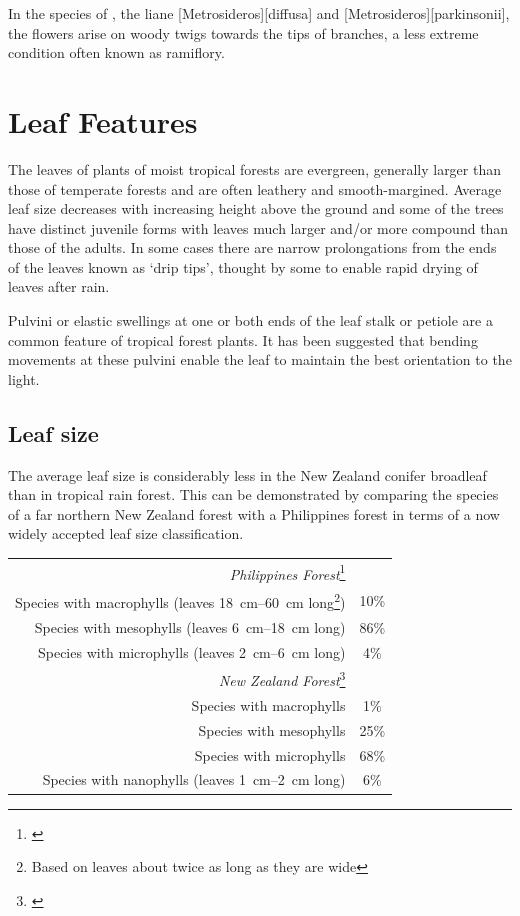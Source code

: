 In the species of ,  the liane [Metrosideros][diffusa] and [Metrosideros][parkinsonii], the flowers arise on woody twigs towards the tips of branches, a less extreme condition often known as ramiflory.

\section{Leaf Features}

The leaves of plants of moist tropical forests are evergreen, generally larger than those of temperate forests and are often leathery and smooth-margined.
Average leaf size decreases with increasing height above the ground and some of the trees have distinct juvenile forms with leaves much larger and/or more compound than those of the adults.
In some cases there are narrow prolongations from the ends of the leaves known as `drip tips', thought by some to enable rapid drying of leaves after rain.

Pulvini or elastic swellings at one or both ends of the leaf stalk or petiole are a common feature of tropical forest plants.
It has been suggested that bending movements at these pulvini enable the leaf to maintain the best orientation to the light.

\subsection{Leaf size}

The average leaf size is considerably less in the New Zealand conifer broadleaf than in tropical rain forest.
This can be demonstrated by comparing the species of a far northern New Zealand forest with a Philippines forest in terms of a now widely accepted leaf size classification.

\begin{xltabular}{0.8\textwidth}{ R c }
	\toprule
	\emph{Philippines Forest}\footnote{\cite{richards1952tropical}}\\
	Species with macrophylls (leaves \SIrange{18}{60}{\centi\metre} long\footnote{Based on leaves about twice as long as they are wide}) & 10\%\\
	Species with mesophylls (leaves \SIrange{6}{18}{\centi\metre} long) & 86\%\\
	Species with microphylls (leaves \SIrange{2}{6}{\centi\metre} long) & 4\%\\
	\emph{New Zealand Forest}\footnote{\cite{dawson1969lowland}}\\
	Species with macrophylls & 1\%\\
	Species with mesophylls & 25\%\\
	Species with microphylls & 68\%\\
	Species with nanophylls (leaves \SIrange{1}{2}{\centi\metre} long) & 6\%\\
	\bottomrule
\end{xltabular}

